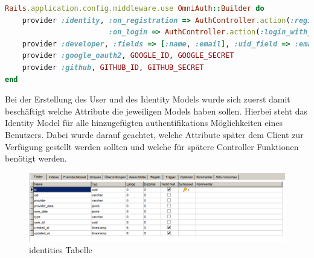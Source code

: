 \documentclass[paper=a4,fontsize=12pt,parskip=half]{scrartcl}
\begin{document}
	\begin{lstlisting}[language=Ruby, style=CodeView, caption=Zu Omniauth hinzugefügte Provider, captionpos=b, label={lst:added_providers}]
Rails.application.config.middleware.use OmniAuth::Builder do
	provider :identity, :on_registration => AuthController.action(:register),
						:on_login => AuthController.action(:login_with_password), :model => PasswordIdentity
	provider :developer, :fields => [:name, :email], :uid_field => :email unless Rails.env.production?
	provider :google_oauth2, GOOGLE_ID, GOOGLE_SECRET
	provider :github, GITHUB_ID, GITHUB_SECRET
end
	\end{lstlisting}
	
	Bei der Erstellung des User und des Identity Models wurde sich zuerst damit beschäftigt welche Attribute die jeweiligen Models haben sollen. Hierbei steht das Identity Model für alle hinzugefügten authentifikations Möglichkeiten eines Benutzers. Dabei wurde darauf geachtet, welche Attribute später dem Client zur Verfügung gestellt werden sollten und welche für spätere Controller Funktionen benötigt werden. 
	
	\begin{figure}[h]
		\includegraphics[width=\textwidth]{images/identities_table.png}
		\caption{identities Tabelle}
		\label{fig:identities_table}
	\end{figure}
	
\end{document}
